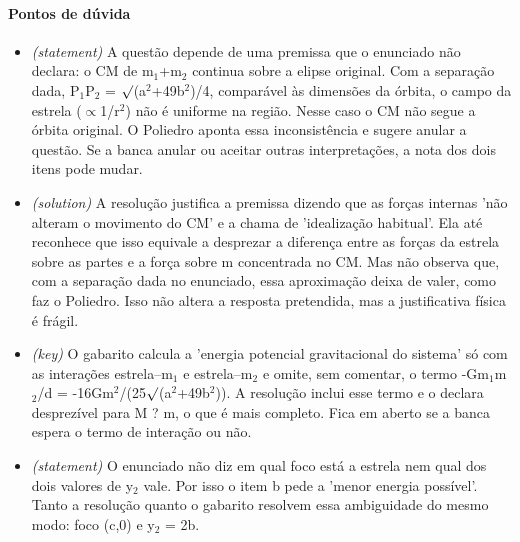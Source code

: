 \documentclass{article}%
\begin{document}
\paragraph{Pontos de dúvida}%
\begin{itemize}%
\item%
\textit{(statement)} A questão depende de uma premissa que o enunciado não declara: o CM de m$_{1}$+m$_{2}$ continua sobre a elipse original. Com a separação dada, P$_{1}$P$_{2}$ = $\surd$(a$^2$+49b$^2$)/4, comparável às dimensões da órbita, o campo da estrela ($\propto$1/r$^2$) não é uniforme na região. Nesse caso o CM não segue a órbita original. O Poliedro aponta essa inconsistência e sugere anular a questão. Se a banca anular ou aceitar outras interpretações, a nota dos dois itens pode mudar.%
\item%
\textit{(solution)} A resolução justifica a premissa dizendo que as forças internas 'não alteram o movimento do CM' e a chama de 'idealização habitual'. Ela até reconhece que isso equivale a desprezar a diferença entre as forças da estrela sobre as partes e a força sobre m concentrada no CM. Mas não observa que, com a separação dada no enunciado, essa aproximação deixa de valer, como faz o Poliedro. Isso não altera a resposta pretendida, mas a justificativa física é frágil.%
\item%
\textit{(key)} O gabarito calcula a 'energia potencial gravitacional do sistema' só com as interações estrela--m$_{1}$ e estrela--m$_{2}$ e omite, sem comentar, o termo -Gm$_{1}$m$_{2}$/d = -16Gm$^2$/(25$\surd$(a$^2$+49b$^2$)). A resolução inclui esse termo e o declara desprezível para M ? m, o que é mais completo. Fica em aberto se a banca espera o termo de interação ou não.%
\item%
\textit{(statement)} O enunciado não diz em qual foco está a estrela nem qual dos dois valores de y$_{2}$ vale. Por isso o item b pede a 'menor energia possível'. Tanto a resolução quanto o gabarito resolvem essa ambiguidade do mesmo modo: foco (c,0) e y$_{2}$ = 2b.%
\end{itemize}%
\end{document}
